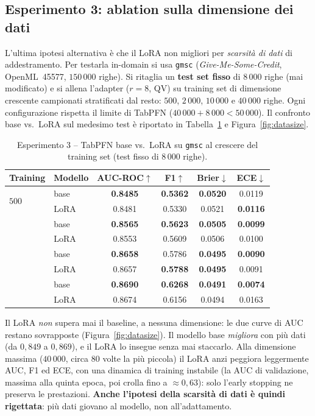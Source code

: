 \documentclass[11pt,a4paper]{article}
\begin{document}
\subsection{Esperimento 3: ablation sulla dimensione dei dati}
\label{sec:datasize}
L'ultima ipotesi alternativa è che il LoRA non migliori per \emph{scarsità di
dati} di addestramento. Per testarla in-domain si usa \texttt{gmsc}
(\emph{Give-Me-Some-Credit}, OpenML~45577, $150\,000$ righe). Si ritaglia un
\textbf{test set fisso} di $8\,000$ righe (mai modificato) e si allena l'adapter
($r=8$, QV) su training set di dimensione crescente campionati stratificati dal
resto: $500$, $2\,000$, $10\,000$ e $40\,000$ righe. Ogni configurazione rispetta
il limite di TabPFN ($40\,000 + 8\,000 < 50\,000$). Il confronto base vs.\ LoRA
sul medesimo test è riportato in Tabella~\ref{tab:datasize} e
Figura~\ref{fig:datasize}.

\begin{table}[h]
\centering
\caption{Esperimento 3 -- TabPFN base vs.\ LoRA su \texttt{gmsc} al crescere del
training set (test fisso di $8\,000$ righe).}
\label{tab:datasize}
\small
\begin{tabular}{llcccc}
\toprule
Training & Modello & AUC-ROC$\uparrow$ & F1$\uparrow$ & Brier$\downarrow$ & ECE$\downarrow$ \\
\midrule
\multirow{2}{*}{$500$}
 & base & \textbf{0.8485} & \textbf{0.5362} & \textbf{0.0520} & 0.0119 \\
 & LoRA & 0.8481 & 0.5330 & 0.0521 & \textbf{0.0116} \\
\addlinespace
\multirow{2}{*}{$2\,000$}
 & base & \textbf{0.8565} & \textbf{0.5623} & \textbf{0.0505} & \textbf{0.0099} \\
 & LoRA & 0.8553 & 0.5609 & 0.0506 & 0.0100 \\
\addlinespace
\multirow{2}{*}{$10\,000$}
 & base & \textbf{0.8658} & 0.5786 & \textbf{0.0495} & \textbf{0.0090} \\
 & LoRA & 0.8657 & \textbf{0.5788} & \textbf{0.0495} & 0.0091 \\
\addlinespace
\multirow{2}{*}{$40\,000$}
 & base & \textbf{0.8690} & \textbf{0.6268} & \textbf{0.0491} & \textbf{0.0074} \\
 & LoRA & 0.8674 & 0.6156 & 0.0494 & 0.0163 \\
\bottomrule
\end{tabular}
\end{table}

Il LoRA \emph{non} supera mai il baseline, a nessuna dimensione: le due curve di
AUC restano sovrapposte (Figura~\ref{fig:datasize}). Il modello base
\emph{migliora} con più dati (da $0{,}849$ a $0{,}869$), e il LoRA lo insegue
senza mai staccarlo. Alla dimensione massima ($40\,000$, circa $80$ volte la più
piccola) il LoRA anzi peggiora leggermente AUC, F1 ed ECE, con una dinamica di
training instabile (la AUC di validazione, massima alla quinta epoca, poi crolla
fino a $\approx 0{,}63$): solo l'early stopping ne preserva le prestazioni.
\textbf{Anche l'ipotesi della scarsità di dati è quindi rigettata}: più dati
giovano al modello, non all'adattamento.
\end{document}
